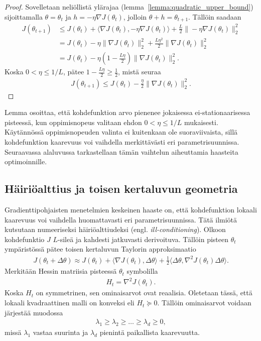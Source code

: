 \begin{proof}
  Sovelletaan neliöllistä ylärajaa (lemma~\ref{lemma:quadratic_upper_bound})
  sijoittamalla \(\theta = \theta_t\) ja \(h = -\eta\nabla J(\theta_t)\),
  jolloin \(\theta + h = \theta_{t+1}\). Tällöin saadaan
  \begin{align*}
    J(\theta_{t+1})
    &\le
    J(\theta_t)
    +
    \langle \nabla J(\theta_t), -\eta\nabla J(\theta_t)\rangle
    +
    \frac{L}{2}\|-\eta\nabla J(\theta_t)\|_2^2 \\
    &=
    J(\theta_t)
    -
    \eta\|\nabla J(\theta_t)\|_2^2
    +
    \frac{L\eta^2}{2}\|\nabla J(\theta_t)\|_2^2 \\
    &=
    J(\theta_t)
    -
    \eta\left(1-\frac{L\eta}{2}\right)
    \|\nabla J(\theta_t)\|_2^2.
  \end{align*}
  Koska \(0<\eta\le 1/L\), pätee \(1-\frac{L\eta}{2} \ge \frac{1}{2}\), mistä seuraa
  \begin{align*}
    J(\theta_{t+1})
    \le
    J(\theta_t)
    -
    \frac{\eta}{2}\|\nabla J(\theta_t)\|_2^2.
  \end{align*}
\end{proof}

Lemma osoittaa, että kohdefunktion arvo pienenee jokaisessa
ei-stationaarisessa pisteessä, kun oppimisnopeus valitaan ehdon
\(0<\eta\le 1/L\) mukaisesti. Käytännössä oppimisnopeuden valinta ei kuitenkaan ole suoraviivaista, sillä kohdefunktion kaarevuus voi vaihdella merkittävästi eri parametrisuunnissa. Seuraavassa alaluvussa tarkastellaan tämän vaihtelun aiheuttamia haasteita optimoinnille.

\subsection{Häiriöalttius ja toisen kertaluvun geometria}
\label{subsec:häiriöalttius}

Gradienttipohjaisten menetelmien keskeinen haaste on, että
kohdefunktion lokaali kaarevuus voi vaihdella huomattavasti eri
parametrisuunnissa. Tätä ilmiötä kutsutaan numeeriseksi
häiriöalttiudeksi (engl. \emph{ill-conditioning}). Olkoon kohdefunktio
\(J\) \(L\)-sileä ja kahdesti jatkuvasti derivoituva. Tällöin pisteen
\(\theta_t\) ympäristössä pätee toisen kertaluvun Taylorin approksimaatio
\begin{align*}
  J(\theta_t+\Delta\theta)
  \approx
  J(\theta_t)
  +
  \langle\nabla J(\theta_t),\Delta\theta\rangle
  +
  \frac{1}{2}
  \langle\Delta\theta,\nabla^2J(\theta_t)\Delta\theta\rangle.
\end{align*}
Merkitään Hessin matriisia pisteessä \(\theta_t\) symbolilla
\begin{align*}
  H_t=\nabla^2J(\theta_t).
\end{align*}
Koska \(H_t\) on symmetrinen, sen ominaisarvot ovat reaalisia. Oletetaan
tässä, että lokaali kvadraattinen malli on konveksi eli
\(H_t\succeq 0\). Tällöin ominaisarvot voidaan järjestää muodossa
\begin{align*}
  \lambda_1\ge\lambda_2\ge\dots\ge\lambda_d\ge 0,
\end{align*}
missä \(\lambda_1\) vastaa suurinta ja \(\lambda_d\) pienintä
paikallista kaarevuutta.

